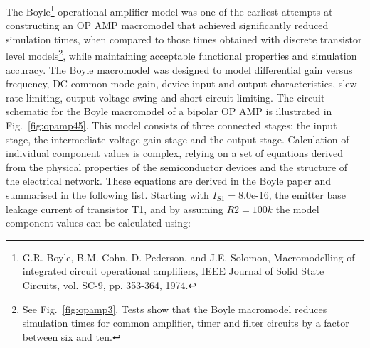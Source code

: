 The Boyle\footnote{G.R. Boyle, B.M. Cohn, D. Pederson, and J.E. Solomon, Macromodelling of integrated circuit operational amplifiers, IEEE Journal of Solid State Circuits, vol. SC-9, pp. 353-364, 1974.} operational amplifier model was one of the earliest attempts at constructing an OP AMP macromodel that achieved significantly reduced simulation times, when compared to those times obtained with discrete transistor level models\footnote{See Fig.~\ref{fig:opamp3}. Tests show that the Boyle macromodel reduces simulation times for common amplifier, timer and filter circuits by a factor between six and ten.}, while maintaining acceptable functional properties and simulation accuracy. The Boyle macromodel was designed to model differential gain versus frequency, DC common-mode gain, device input and output characteristics, slew rate limiting, output voltage swing and short-circuit limiting.  The circuit schematic for the Boyle macromodel of a bipolar OP AMP  is illustrated in Fig.~\ref{fig:opamp45}. This model consists of three connected stages: the input stage, the intermediate voltage gain stage and the output stage. Calculation of individual component values is complex, relying on a set of equations derived from the physical properties of the semiconductor devices and the structure of the electrical network.  These equations are derived in the Boyle paper and summarised in the following list. Starting with $I_{S1} = $8.0e-16, the emitter base leakage current of transistor T1, and by assuming $R2 = 100k$ the model component values can be calculated using:
